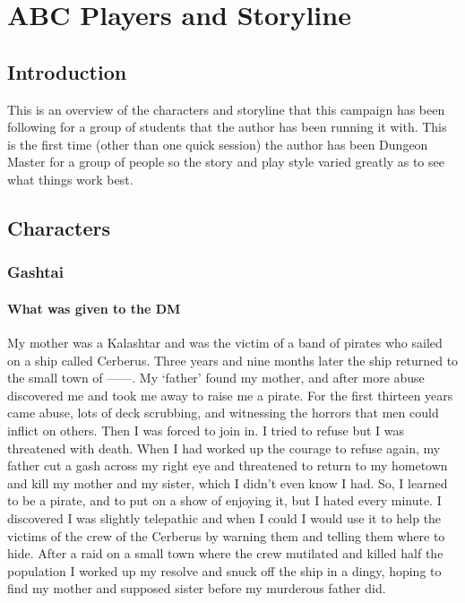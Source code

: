 \chapter{ABC Players and Storyline}

\section{Introduction}

This is an overview of the characters and storyline that this campaign has been following for a group of students that the author has been running it with. This is the first time (other than one quick session) the author has been Dungeon Master for a group of people so the story and play style varied greatly as to see what things work best.

\section{Characters}

\subsection{Gashtai}

\subsubsection{What was given to the DM}

My mother was a Kalashtar and was the victim of a band of pirates who sailed on a ship called Cerberus. Three years and nine months later the ship returned to the small town of ------. My ‘father’ found my mother, and after more abuse discovered me and took me away to raise me a pirate. For the first thirteen years came abuse, lots of deck scrubbing, and witnessing the horrors that men could inflict on others. Then I was forced to join in. I tried to refuse but I was threatened with death. When I had worked up the courage to refuse again, my father cut a gash across my right eye and threatened to return to my hometown and kill my mother and my sister, which I didn't even know I had. So, I learned to be a pirate, and to put on a show of enjoying it, but I hated every minute. I discovered I was slightly telepathic and when I could I would use it to help the victims of the crew of the Cerberus by warning them and telling them where to hide. After a raid on a small town where the crew mutilated and killed half the population I worked up my resolve and snuck off the ship in a dingy, hoping to find my mother and supposed sister before my murderous father did. 


